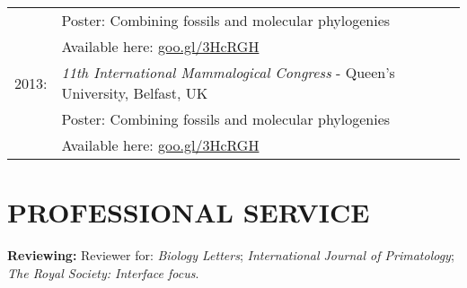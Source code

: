\documentclass[10pt,a4paper]{article}
\begin{document}
{\begin{tabular}{ll}
& Poster: Combining fossils and molecular phylogenies\\
& Available here: \href{http://figshare.com/articles/Combining_fossils_and_molecular_phylogenies/1056300}{goo.gl/3HcRGH}\\
2013: & \textit{11th International Mammalogical Congress} - Queen's University, Belfast, UK \\
& Poster: Combining fossils and molecular phylogenies\\
& Available here: \href{http://figshare.com/articles/Combining_fossils_and_molecular_phylogenies/1056300}{goo.gl/3HcRGH}\\
\end{tabular}
\bigskip



\bigskip


\section{PROFESSIONAL SERVICE}
\raggedright\textbf{Reviewing:}
Reviewer for: \textit{Biology Letters}; \textit{International Journal of Primatology}; \textit{The Royal Society: Interface focus}.
\bigskip

}
\end{document}
